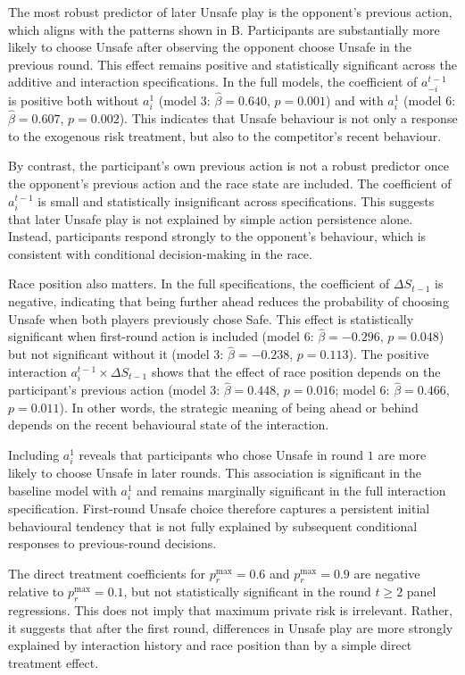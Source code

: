 \documentclass[pdflatex,sn-mathphys-ay]{sn-jnl}
\theoremstyle{thmstyleone}
\theoremstyle{thmstyletwo}
\theoremstyle{thmstylethree}
\begin{document}
The most robust predictor of later Unsafe play is the opponent's previous action, which aligns with the patterns shown in B. Participants are substantially more likely to choose Unsafe after observing the opponent choose Unsafe in the previous round. This effect remains positive and statistically significant across the additive and interaction specifications. In the full models, the coefficient of $a_{-i}^{t-1}$ is positive both without $a_i^1$ (model 3: $\hat{\beta}=0.640$, $p=0.001$) and with $a_i^1$ (model 6: $\hat{\beta}=0.607$, $p=0.002$). This indicates that Unsafe behaviour is not only a response to the exogenous risk treatment, but also to the competitor's recent behaviour.

By contrast, the participant's own previous action is not a robust predictor once the opponent's previous action and the race state are included. The coefficient of $a_i^{t-1}$ is small and statistically insignificant across specifications. This suggests that later Unsafe play is not explained by simple action persistence alone. Instead, participants respond strongly to the opponent's behaviour, which is consistent with conditional decision-making in the race.

Race position also matters. In the full specifications, the coefficient of $\Delta S_{t-1}$ is negative, indicating that being further ahead reduces the probability of choosing Unsafe when both players previously chose Safe. This effect is statistically significant when first-round action is included (model 6: $\hat{\beta}=-0.296$, $p=0.048$) but not significant without it (model 3: $\hat{\beta}=-0.238$, $p=0.113$). The positive interaction $a_i^{t-1}\times \Delta S_{t-1}$ shows that the effect of race position depends on the participant's previous action (model 3: $\hat{\beta}=0.448$, $p=0.016$; model 6: $\hat{\beta}=0.466$, $p=0.011$). In other words, the strategic meaning of being ahead or behind depends on the recent behavioural state of the interaction.

Including $a_i^1$ reveals that participants who chose Unsafe in round $1$ are more likely to choose Unsafe in later rounds. This association is significant in the baseline model with $a_i^1$ and remains marginally significant in the full interaction specification. First-round Unsafe choice therefore captures a persistent initial behavioural tendency that is not fully explained by subsequent conditional responses to previous-round decisions.

The direct treatment coefficients for $p_r^{\max}=0.6$ and $p_r^{\max}=0.9$ are negative relative to $p_r^{\max}=0.1$, but not statistically significant in the round $t\geq2$ panel regressions. This does not imply that maximum private risk is irrelevant. Rather, it suggests that after the first round, differences in Unsafe play are more strongly explained by interaction history and race position than by a simple direct treatment effect.
\end{document}
